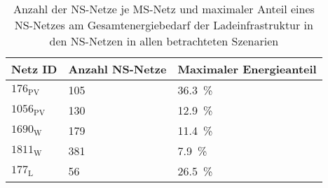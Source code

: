 {
\renewcommand{\arraystretch}{1.2}%
\begin{table}[H]
	\begin{center}
		\caption{Anzahl der NS-Netze je MS-Netz und maximaler Anteil eines NS-Netzes am Gesamtenergiebedarf der Ladeinfrastruktur in den NS-Netzen in allen betrachteten Szenarien}
		\begin{tabu} to 0.6\textwidth {X[0.5] X[1.1, r] X[1.5, r]}
			\toprule
			Netz ID    & Anzahl NS-Netze & Maximaler Energieanteil 			\\ \midrule
			\(176_{\text{PV}}\)  & \num{105}       & \SI{36.3}{\percent}              \\
			\(1056_{\text{PV}}\) & \num{130}       & \SI{12.9}{\percent}              \\
			\(1690_{\text{W}}\) & \num{179}       & \SI{11.4}{\percent}              \\
			\(1811_{\text{W}}\) & \num{381}       & \SI{7.9}{\percent}               \\
			\(177_{\text{L}}\)  & \num{56}        & \SI{26.5}{\percent}              \\ \bottomrule
		\end{tabu}
		\label{tab:largestLVGridShare}
	\end{center}
	\vspace{-3mm}%
\end{table}
}